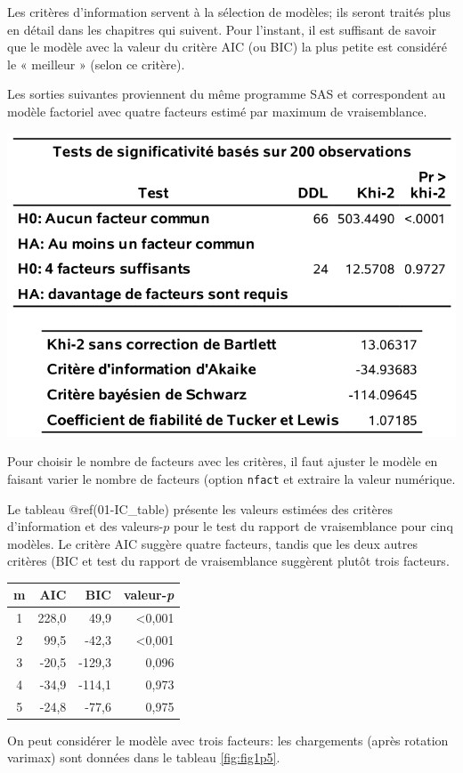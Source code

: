 \documentclass[
]{book}
\theoremstyle{definition}
\theoremstyle{definition}
\theoremstyle{definition}
\theoremstyle{remark}
\begin{document}
Les critères d'information servent à la sélection de modèles; ils seront traités plus en détail dans les chapitres qui suivent. Pour l'instant, il est suffisant de savoir que le modèle avec la valeur du critère AIC (ou BIC) la plus petite est considéré le « meilleur » (selon ce critère).

Les sorties suivantes proviennent du même programme SAS et correspondent au modèle factoriel avec quatre facteurs estimé par maximum de vraisemblance.

\begin{center}\includegraphics[width=0.7\linewidth]{figures/01-facto-e4} \end{center}

Pour choisir le nombre de facteurs avec les critères, il faut ajuster le modèle en faisant varier le nombre de facteurs (option \texttt{nfact} et extraire la valeur numérique.

Le tableau @ref(01-IC\_table) présente les valeurs estimées des critères d'information et des valeurs-\(p\) pour le test du rapport de vraisemblance pour cinq modèles. Le critère AIC suggère quatre facteurs, tandis que les deux autres critères (BIC et test du rapport de vraisemblance suggèrent plutôt trois facteurs.

\begin{longtable}[]{@{}crrr@{}}
\toprule
m & AIC & BIC & valeur-\emph{p}\tabularnewline
\midrule
\endhead
1 & 228,0 & 49,9 & \textless0,001\tabularnewline
2 & 99,5 & -42,3 & \textless0,001\tabularnewline
3 & -20,5 & -129,3 & 0,096\tabularnewline
4 & -34,9 & -114,1 & 0,973\tabularnewline
5 & -24,8 & -77,6 & 0,975\tabularnewline
\bottomrule
\end{longtable}

On peut considérer le modèle avec trois facteurs: les chargements (après rotation varimax) sont données dans le tableau \ref{fig:fig1p5}.
\end{document}
